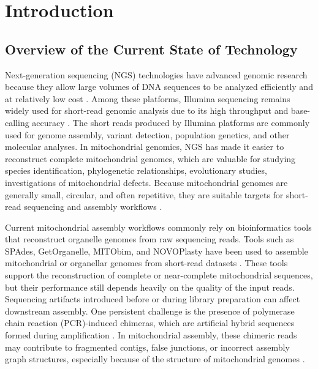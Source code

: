 
\chapter{Introduction}
\label{sec:researchdesc}

\section{Overview of the Current State of Technology}
\label{sec:overview}

Next-generation sequencing (NGS) technologies have advanced genomic research because they allow large volumes of DNA sequences to be analyzed efficiently and at relatively low cost \citep{Metzker2010}. Among these platforms, Illumina sequencing remains widely used for short-read genomic analysis due to its high throughput and base-calling accuracy \citep{Bentley2008,Glenn2011}. The short reads produced by Illumina platforms are commonly used for genome assembly, variant detection, population genetics, and other molecular analyses. In mitochondrial genomics, NGS has made it easier to reconstruct complete mitochondrial genomes, which are valuable for studying species identification, phylogenetic relationships, evolutionary studies, investigations of mitochondrial defects. Because mitochondrial genomes are generally small, circular, and  often repetitive, they are suitable targets for short-read sequencing and assembly workflows \citep{Boore1999,Gray2012,Dierckxsens2017}.

Current mitochondrial assembly workflows commonly rely on bioinformatics tools that reconstruct organelle genomes from raw sequencing reads. Tools such as SPAdes, GetOrganelle, MITObim, and NOVOPlasty have been used to assemble mitochondrial or organellar genomes from short-read datasets \citep{Bankevich2012,Hahn2013,Dierckxsens2017,Jin2020}. These tools support the reconstruction of complete or near-complete mitochondrial sequences, but their performance still depends heavily on the quality of the input reads. Sequencing artifacts introduced before or during library preparation can affect downstream assembly. One persistent challenge is the presence of polymerase chain reaction (PCR)-induced chimeras, which are artificial hybrid sequences formed during amplification \citep{Judo1998,Qiu2001}. In mitochondrial assembly, these chimeric reads may contribute to fragmented contigs, false junctions, or incorrect assembly graph structures, especially because of the structure of mitochondrial genomes \citep{Boore1999,Cameron2014}.

